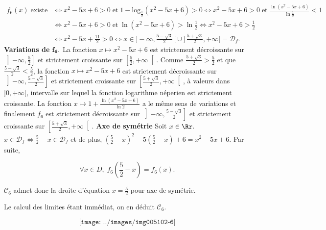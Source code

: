 {\begin{enumerate}
{\begin{align*}
f_6(x)\;\mbox{existe}&\Leftrightarrow x^2-5x+6>0\;\mbox{et}\;1-\mbox{log}_{\frac{1}{2}}(x^2-5x+6)>0
\Leftrightarrow x^2-5x+6>0\;\mbox{et}\;\frac{\ln(x^2-5x+6)}{\ln\frac{1}{2}}<1\\
 &\Leftrightarrow x^2-5x+6>0\;\mbox{et}\;\ln(x^2-5x+6)>\ln\frac{1}{2}\Leftrightarrow x^2-5x+6>\frac{1}{2}\\
 &\Leftrightarrow x^2-5x+\frac{11}{2}>0\Leftrightarrow x\in]-\infty,\frac{5-\sqrt{3}}{2}[\cup]\frac{5+\sqrt{3}}{2},+\infty[=\mathcal{D}_f.
\end{align*}
\textbf{Variations de} $\bf{f_6.}$ La fonction $x\mapsto x^2-5x+6$ est strictement décroissante sur
$\left]-\infty,\frac{5}{2}\right]$ et strictement croissante sur $\left[\frac{5}{2},+\infty\right[$. Comme
$\frac{5+\sqrt{3}}{2}>\frac{5}{2}$ et que $\frac{5-\sqrt{3}}{2}<\frac{5}{2}$, la fonction $x\mapsto x^2-5x+6$ est
strictement décroissante sur$\left]-\infty,\frac{5-\sqrt{3}}{2}\right]$ et strictement croissante sur
$\left[\frac{5+\sqrt{3}}{2},+\infty\right[$, à valeurs dans $]0,+\infty[$, intervalle sur lequel la fonction logarithme néperien
est strictement croissante. La fonction $x\mapsto1+\frac{\ln(x^2-5x+6)}{\ln2}$ a le même sens de variations et
finalement $f_6$ est strictement décroissante sur $\left]-\infty,\frac{5-\sqrt{3}}{2}\right]$ et strictement croissante
sur $\left[\frac{5+\sqrt{3}}{2},+\infty\right[$.
\textbf{Axe de symétrie} Soit $x\in\Rr$. $x\in\mathcal{D}_f\Leftrightarrow\frac{5}{2}-x\in\mathcal{D}_f$ et de 
plus, $\left(\frac{5}{2}-x\right)^2-5\left(\frac{5}{2}-x\right)+6=x^2-5x+6$. Par suite,

$$\forall x\in D,\;f_6(\frac{5}{2}-x)=f_6(x).$$

$\mathcal{C}_6$ admet donc la droite d'équation $x=\frac{5}{2}$ pour axe de symétrie.

Le calcul des limites étant immédiat, on en déduit $\mathcal{C}_6$.

$$\texttt{[image: ../images/img005102-6]}$$}
\end{enumerate}
}

